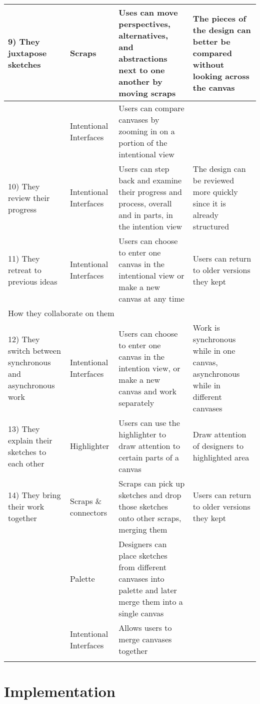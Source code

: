 \begin{center}
\begin{longtable}{|p{4cm}|p{4cm}|p{4cm}|p{4cm}|}
\hline
9)      They juxtapose sketches	&Scraps	&Uses can move perspectives, alternatives, and abstractions next to one another by moving scraps	&The pieces of the design can better be compared without looking across the canvas\\
\hline
	&Intentional Interfaces	&Users can compare canvases by zooming in on a portion of the intentional view	&\\
\hline
10)  They review their progress	&Intentional Interfaces	&Users can step back and examine their progress and process, overall and in parts, in the intention view	&The design can be reviewed more quickly since it is already structured\\
\hline
11)  They retreat to previous ideas	&Intentional Interfaces	&Users can choose to enter one canvas in the intentional view or make a new canvas at any time	&Users can return to older versions they kept\\
\hline
\multicolumn{4}{|l|}{How they collaborate on them}\\
\hline
12)  They switch between synchronous and asynchronous work	&Intentional Interfaces	&Users can choose to enter one canvas in the intention view, or make a new canvas and work separately	&Work is synchronous while in one canvas, asynchronous while in different canvases\\
\hline
13)  They explain their sketches to each other	&Highlighter	&Users can use the highlighter to draw attention to certain parts of a canvas	&Draw attention of designers to highlighted area\\
\hline
14)  They bring their work together	&Scraps \& connectors	&Scraps can pick up sketches and drop those sketches onto other scraps, merging them	&Users can return to older versions they kept\\
\hline
	&Palette	&Designers can place sketches from different canvases into palette and later merge them into a single canvas	&\\
\hline
	&Intentional Interfaces	&Allows users to merge canvases together	&\\
\label{table:calico-version-two:designbehaviors}
\end{longtable}
\end{center}



\section{Implementation}
\label{chapter:calico-version-two:implementation}

